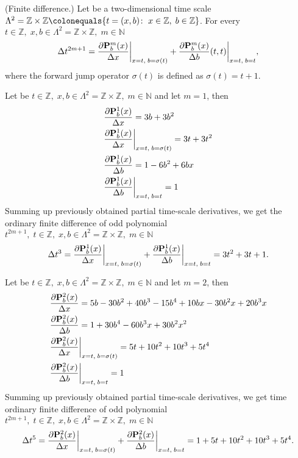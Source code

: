 \begin{cor}
    \label{finite_difference_case}
    (Finite difference.)
    Let be a two-dimensional time scale
    $\Lambda^2 = \mathbb{Z} \times \mathbb{Z} \colonequals \{t=(x, b) \colon \; x\in \mathbb{Z}, \; b\in \mathbb{Z} \}$.
    For every $t\in\mathbb{Z}, \; x,b\in \Lambda^2 = \mathbb{Z} \times \mathbb{Z}, \; m\in\mathbb{N}$
    \[
        \Delta t^{2m+1}
        = \frac{\partial {\mathbf{P}}\sp{m} \sb{b}(x)}{\Delta x} \bigg |_{x = t, \; b = \sigma(t)}
        + \frac{\partial {\mathbf{P}}\sp{m} \sb{b}(x)}{\Delta b}(t, t) \bigg |_{x = t, \; b = t},
    \]
    where the forward jump operator $\sigma(t)$ is defined as $\sigma(t) = t+1$.
\end{cor}
\begin{examp}
    \label{time_scale_z_example_1}
    Let be $t\in\mathbb{Z}, \;x,b\in\Lambda^2 = \mathbb{Z} \times \mathbb{Z}, \; m\in\mathbb{N}$ and let $m=1$, then
    \begin{align*}
        &\frac{\partial {\mathbf{P}}\sp{1} \sb{b}(x)}{\Delta x} = 3 b + 3 b^2 \\
        &\frac{\partial {\mathbf{P}}\sp{1} \sb{b}(x)}{\Delta x} \bigg |_{x = t, \; b = \sigma(t)} = 3 t + 3 t^2\\
        &\frac{\partial {\mathbf{P}}\sp{1} \sb{b}(x)}{\Delta b}= 1 - 6 b^2 + 6 b x\\
        &\frac{\partial {\mathbf{P}}\sp{1} \sb{b}(x)}{\Delta b}\bigg |_{x = t, \; b = t}= 1
    \end{align*}
    Summing up previously obtained partial time-scale derivatives, we get the ordinary finite difference of odd polynomial
    $t^{2m+1}, \; t\in\mathbb{Z}, \; x,b\in\Lambda^2 = \mathbb{Z} \times \mathbb{Z}, \; m\in\mathbb{N}$
    \[
        \Delta t^{3}
        = \frac{\partial {\mathbf{P}}\sp{1} \sb{b}(x)}{\Delta x} \bigg |_{x = t, \; b = \sigma(t)}
        + \frac{\partial {\mathbf{P}}\sp{1} \sb{b}(x)}{\Delta b} \bigg |_{x = t, \; b = t}
        = 3 t^2 + 3 t + 1.
    \]
\end{examp}
\begin{examp}
    \label{time_scale_z_example_2}
    Let be $t\in\mathbb{Z}, \;x,b\in\Lambda^2 = \mathbb{Z} \times \mathbb{Z}, \; m\in\mathbb{N}$
    and let $m=2$, then
    \begin{align*}
        &\frac{\partial {\mathbf{P}}\sp{2} \sb{b}(x)}{\Delta x} = 5 b - 30 b^2 + 40 b^3 - 15 b^4 + 10 b x - 30 b^2 x + 20 b^3 x \\
        &\frac{\partial {\mathbf{P}}\sp{2} \sb{b}(x)}{\Delta b} = 1 + 30 b^4 - 60 b^3 x + 30 b^2 x^2 \\
        &\frac{\partial {\mathbf{P}}\sp{2} \sb{b}(x)}{\Delta x} \bigg |_{x = t, \; b = \sigma(t)} = 5 t + 10 t^2 + 10 t^3 + 5 t^4 \\
        &\frac{\partial {\mathbf{P}}\sp{2} \sb{b}(x)}{\Delta b} \bigg |_{x = t, \; b = t} = 1
    \end{align*}
    Summing up previously obtained partial time-scale derivatives, we get time ordinary finite difference of odd polynomial
    $t^{2m+1}, \; t\in\mathbb{Z}, \;x,b\in\Lambda^2 = \mathbb{Z} \times \mathbb{Z}, \; m\in\mathbb{N}$
    \[
        \Delta t^{5}
        = \frac{\partial {\mathbf{P}}\sp{2} \sb{b}(x)}{\Delta x} \bigg |_{x = t, \; b = \sigma(t)}
        + \frac{\partial {\mathbf{P}}\sp{2} \sb{b}(x)}{\Delta b} \bigg |_{x = t, \; b = t}
        = 1 + 5 t + 10 t^2 + 10 t^3 + 5 t^4.
    \]
\end{examp}
